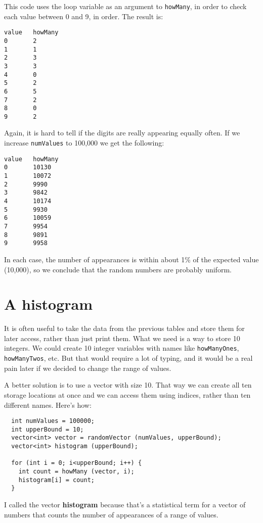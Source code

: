 This code uses the loop variable as an argument to
{\tt howMany}, in order to check each value between 0 and 9,
in order.  The result is:

\begin{verbatim}
value   howMany
0       2
1       1
2       3
3       3
4       0
5       2
6       5
7       2
8       0
9       2
\end{verbatim}
%
Again, it is hard to tell if the digits are really appearing
equally often.  If we increase {\tt numValues} to 100,000 we
get the following:

\begin{verbatim}
value   howMany
0       10130
1       10072
2       9990
3       9842
4       10174
5       9930
6       10059
7       9954
8       9891
9       9958
\end{verbatim}
%
In each case, the number of appearances is within about 1\% of
the expected value (10,000), so we conclude that the random
numbers are probably uniform.

\section {A histogram}

It is often useful to take the data from the previous tables
and store them for later access, rather than just print them.
What we need is a way to store 10 integers.  We could create
10 integer variables with names like {\tt howManyOnes},
{\tt howManyTwos}, etc.  But that would require a lot of
typing, and it would be a real pain later if we decided to
change the range of values.

A better solution is to use a vector with size 10.  That
way we can create all ten storage locations at once and we
can access them using indices, rather than ten different names.
Here's how:

\begin{verbatim}
  int numValues = 100000;
  int upperBound = 10;
  vector<int> vector = randomVector (numValues, upperBound);
  vector<int> histogram (upperBound);

  for (int i = 0; i<upperBound; i++) {
    int count = howMany (vector, i);
    histogram[i] = count;
  }
\end{verbatim}
%
I called the vector {\bf histogram} because that's
a statistical term for a vector of numbers that counts the
number of appearances of a range of values.


